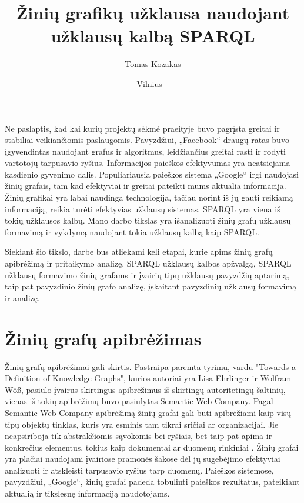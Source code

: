 \documentclass{VUMIFPSkursinis}
\institute{Informatikos institutas}  %
\title{Žinių grafikų užklausa naudojant užklausų kalbą SPARQL}
\author{Tomas Kozakas}
\date{Vilnius – \the\year}
\begin{document}
\maketitle

\tableofcontents

Ne paslaptis, kad kai kurių projektų sėkmė praeityje buvo pagrįsta greitai ir stabiliai veikiančiomis paslaugomis. Pavyzdžiui, „Facebook“ draugų ratas buvo įgyvendintas naudojant grafus ir algoritmus, leidžiančius greitai rasti ir rodyti vartotojų tarpusavio ryšius. Informacijos paieškos efektyvumas yra neatsiejama kasdienio gyvenimo dalis. Populiariausia paieškos sistema „Google“ irgi naudojasi žinių grafais, tam kad efektyviai ir greitai pateikti mums aktualia informacija. Žinių grafikai yra labai naudinga technologija, tačiau norint iš jų gauti reikiamą informaciją, reikia turėti efektyvias užklausų sistemas. SPARQL yra viena iš tokių užklausos kalbų. Mano darbo tikslas yra išanalizuoti žinių grafų užklausų formavimą ir vykdymą naudojant tokia užklausų kalbą kaip SPARQL.

Siekiant šio tikslo, darbe bus atliekami keli etapai, kurie apims žinių grafų apibrėžimą ir pritaikymo analizę, SPARQL užklausų kalbos apžvalgą, SPARQL užklausų formavimo žinių grafams ir įvairių tipų užklausų pavyzdžių aptarimą, taip pat pavyzdinio žinių grafo analizę, įskaitant pavyzdinių užklausų formavimą ir analizę.

\section{Žinių grafų apibrėžimas}
Žinių grafų apibrėžimai gali skirtis. Pastraipa paremta tyrimu, vardu "Towards a Definition of Knowledge Graphs", kurios autoriai yra Lisa Ehrlinger ir Wolfram Wöß, pasiūlo įvairūs skirtingus apibrėžimus iš skirtingų autoritetingų šaltinių, vienas iš tokių apibrėžimų buvo pasiūlytas Semantic Web Company.
Pagal Semantic Web Company apibrėžimą žinių grafai gali būti apibrėžiami kaip visų tipų objektų tinklas, kuris yra esminis tam tikrai sričiai ar organizacijai. Jie neapsiriboja tik abstrakčiomis sąvokomis bei ryšiais, bet taip pat apima ir konkrečius elementus, tokius kaip dokumentai ar duomenų rinkiniai \cite{SemanticWebCompany}. Žinių grafai yra plačiai naudojami įvairiose pramonės šakose dėl jų sugebėjimo efektyviai analizuoti ir atskleisti tarpusavio ryšius tarp duomenų. Paieškos sistemose, pavyzdžiui, „Google“, žinių grafai padeda tobulinti paieškos rezultatus, pateikiant aktualią ir tikslesnę informaciją naudotojams. 
\end{document}
